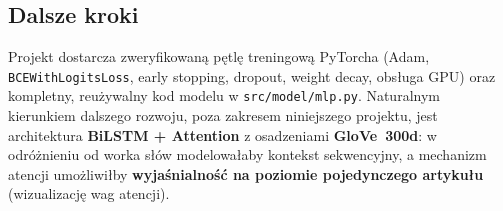 \subsection{Dalsze kroki}

Projekt dostarcza zweryfikowaną pętlę treningową PyTorcha (Adam,
\texttt{BCEWithLogitsLoss}, early stopping, dropout, weight decay, obsługa GPU) oraz
kompletny, reużywalny kod modelu w \texttt{src/model/mlp.py}. Naturalnym kierunkiem
dalszego rozwoju, poza zakresem niniejszego projektu, jest architektura
\textbf{BiLSTM + Attention} z osadzeniami \textbf{GloVe~300d}: w odróżnieniu od worka
słów modelowałaby kontekst sekwencyjny, a mechanizm atencji umożliwiłby
\textbf{wyjaśnialność na poziomie pojedynczego artykułu} (wizualizację wag atencji).
